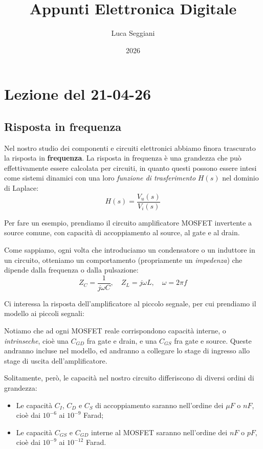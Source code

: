 \documentclass[a4paper,11pt]{article}
\title{Appunti Elettronica Digitale}
\author{Luca Seggiani}
\date{2026}
\begin{document}
\section{Lezione del 21-04-26}

\thispagestyle{empty}
\pagestyle{fancy}

\subsection{Risposta in frequenza}
Nel nostro studio dei componenti e circuiti elettronici abbiamo finora trascurato la risposta in \textbf{frequenza}. La risposta in frequenza è una grandezza che può effettivamente essere calcolata per circuiti, in quanto questi possono essere intesi come sistemi dinamici con una loro \textit{funzione di trasferimento} $H(s)$ nel dominio di Laplace:
$$
H(s) = \frac{V_u(s)}{V_i(s)}
$$

Per fare un esempio, prendiamo il circuito amplificatore MOSFET invertente a source comune, con capacità di accoppiamento al source, al gate e al drain. 


Come sappiamo, ogni volta che introduciamo un condensatore o un induttore in un circuito, otteniamo un comportamento (propriamente un \textit{impedenza}) che dipende dalla frequenza o dalla pulsazione:
$$
Z_C = \frac{1}{j \omega C}, \quad Z_L = j \omega L, \quad \omega = 2 \pi f
$$

Ci interessa la risposta dell'amplificatore al piccolo segnale, per cui prendiamo il modello ai piccoli segnali:


Notiamo che ad ogni MOSFET reale corrispondono capacità interne, o \textit{intrinseche}, cioè una $C_{GD}$ fra gate e drain, e una $C_{GS}$ fra gate e source. Queste andranno incluse nel modello, ed andranno a collegare lo stage di ingresso allo stage di uscita dell'amplificatore.

Solitamente, però, le capacità nel nostro circuito differiscono di diversi ordini di grandezza:
\begin{itemize}
	\item Le capacità $C_I$, $C_D$ e $C_S$ di accoppiamento saranno nell'ordine dei $\mu F$ o $n F$, cioè dai $10^{-6}$ ai $10^{-9}$ Farad;
	\item Le capacità $C_{GS}$ e $C_{GD}$ interne al MOSFET saranno nell'ordine dei $n F$ o $p F$, cioè dai $10^{-9}$ ai $10^{-12}$ Farad.
\end{itemize}
\end{document}
